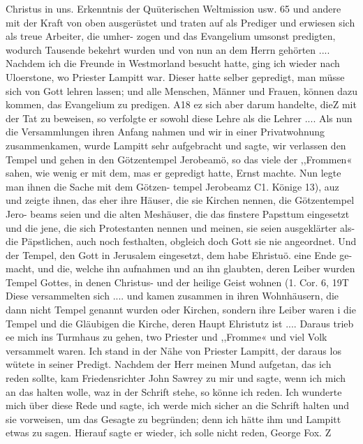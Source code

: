 Christus in uns. Erkenntnis der Quüterischen Weltmission usw. 65
und andere mit der Kraft von oben ausgerüstet und traten auf
als Prediger und erwiesen sich als treue Arbeiter, die umher-
zogen und das Evangelium umsonst predigten, wodurch Tausende
bekehrt wurden und von nun an dem Herrn gehörten ....
Nachdem ich die Freunde in Westmorland besucht hatte, ging
ich wieder nach Uloerstone, wo Priester Lampitt war. Dieser
hatte selber gepredigt, man müsse sich von Gott lehren lassen;
und alle Menschen, Männer und Frauen, können dazu kommen,
das Evangelium zu predigen. A18 ez sich aber darum handelte,
dieZ mit der Tat zu beweisen, so verfolgte er sowohl diese Lehre
als die Lehrer .... Als nun die Versammlungen ihren Anfang
nahmen und wir in einer Privatwohnung zusammenkamen, wurde
Lampitt sehr aufgebracht und sagte, wir verlassen den Tempel
und gehen in den Götzentempel Jerobeamö, so das viele der
,,Frommen« sahen, wie wenig er mit dem, mas er gepredigt hatte,
Ernst machte. Nun legte man ihnen die Sache mit dem Götzen-
tempel Jerobeamz C1. Könige 13), auz und zeigte ihnen, das
eher ihre Häuser, die sie Kirchen nennen, die Götzentempel Jero-
beams seien und die alten Meshäuser, die das finstere Papsttum
eingesetzt und die jene, die sich Protestanten nennen und meinen,
sie seien ausgeklärter als- die Päpstlichen, auch noch festhalten,
obgleich doch Gott sie nie angeordnet. Und der Tempel, den
Gott in Jerusalem eingesetzt, dem habe Ehristuö. eine Ende ge-
macht, und die, welche ihn aufnahmen und an ihn glaubten, deren
Leiber wurden Tempel Gottes, in denen Christus- und der heilige
Geist wohnen (1. Cor. 6, 19T Diese versammelten sich ....
und kamen zusammen in ihren Wohnhäusern, die dann nicht
Tempel genannt wurden oder Kirchen, sondern ihre Leiber waren
i die Tempel und die Gläubigen die Kirche, deren Haupt Ehristutz
ist .... Daraus trieb ee mich ins Turmhaus zu gehen, two Priester
und ,,Fromme« und viel Volk versammelt waren. Ich stand in der
Nähe von Priester Lampitt, der daraus los wütete in seiner
Predigt. Nachdem der Herr meinen Mund aufgetan, das ich
reden sollte, kam Friedensrichter John Sawrey zu mir und sagte,
wenn ich mich an das halten wolle, waz in der Schrift stehe,
so könne ich reden. Ich wunderte mich über diese Rede und sagte,
ich werde mich sicher an die Schrift halten und sie vorweisen,
um das Gesagte zu begründen; denn ich hätte ihm und Lampitt
etwas zu sagen. Hierauf sagte er wieder, ich solle nicht reden,
George Fox. Z


